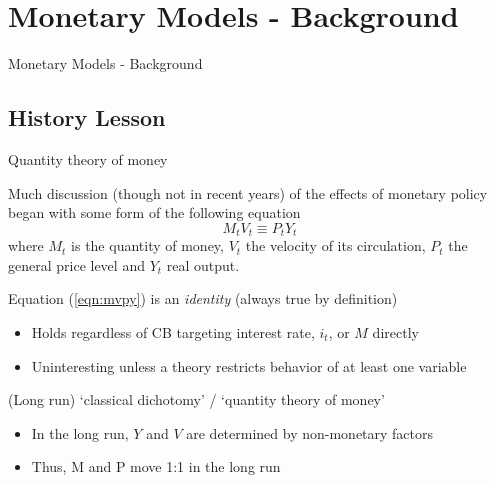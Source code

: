 \section{Monetary Models - Background}

\begin{frame}

\begin{center}
{\LARGE Monetary Models - Background}
\end{center}

\end{frame}

\subsection{History Lesson}

\begin{frame}{Quantity theory of money}

Much discussion (though not in recent years) of the effects of monetary policy began with some form of the following equation
\begin{equation}
M_{t}V_{t} \equiv P_{t}Y_{t} \label{eqn:mvpy}
\end{equation}
where $M_{t}$ is the quantity of money, $V_{t}$ the velocity of its circulation, $P_{t}$ the general price level and $Y_{t}$ real output.

\vspace{2mm}
Equation (\ref{eqn:mvpy}) is an \emph{identity} (always true by definition)
\begin{itemize}
\item Holds regardless of CB targeting interest rate, $i_{t}$, or $M$ directly
\item Uninteresting unless a theory restricts behavior of at least one variable
\end{itemize}

\vspace{2mm}
(Long run) `classical dichotomy' / `quantity theory of money'
\begin{itemize}
\item In the long run, $Y$ and $V$ are determined by non-monetary factors
\item Thus, M and P move 1:1 in the long run
\end{itemize}

\end{frame}

